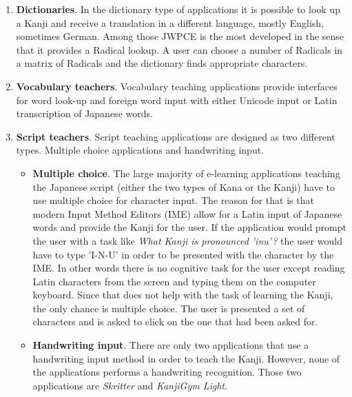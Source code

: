 \begin{enumerate}
  \item \textbf{Dictionaries}. In the dictionary type of applications it is 
        possible to look up a Kanji and receive a translation in a different
        language, mostly English, sometimes German. Among those JWPCE is
        the most developed in the sense that it provides a Radical lookup.
        A user can choose a number of Radicals in a matrix of Radicals
        and the dictionary finds appropriate characters.
  \item \textbf{Vocabulary teachers}. Vocabulary teaching applications provide 
        interfaces for word look-up and foreign word input with either
        Unicode input or Latin transcription of Japanese words.
  \item \textbf{Script teachers}. Script teaching applications are designed 
        as two different types. Multiple choice applications and handwriting 
        input.
        \begin{itemize}
          \item \textbf{Multiple choice}. The large majority of e-learning 
                applications teaching the Japanese script (either the two types
                of Kana or the Kanji) have to use multiple choice for character
                input. The reason for that is that modern 
                Input Method Editors (IME)
                allow for a Latin input of Japanese words and provide the
                Kanji for the user. If the application would prompt the user
                with a task like \emph{What Kanji is pronounced 'inu'?}
                the user would have to type 'I-N-U' in order to be presented
                with the character  by the IME. In other words there is 
                no cognitive task for the user except reading Latin characters 
                from the screen and typing them on the computer keyboard.
                Since that does not help with the task of learning the Kanji,
                the only chance is multiple choice. The user is presented a set 
                of characters and is asked to click on the one that had been 
                asked for.
          \item \textbf{Handwriting input}. There are only two applications
                that use a handwriting input method in order to teach the Kanji.
                However, none of the applications performs a handwriting 
                recognition. Those two applications are \emph{Skritter} and 
                \emph{KanjiGym Light}.
         \end{itemize}
\end{enumerate}

